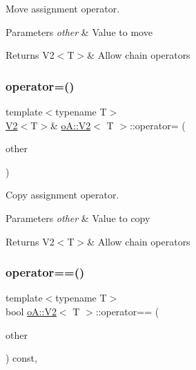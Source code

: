 Move assignment operator. 


\begin{DoxyParams}{Parameters}
{\em other} & Value to move \\
\hline
\end{DoxyParams}
\begin{DoxyReturn}{Returns}
V2$<$\+T$>$\& Allow chain operators 
\end{DoxyReturn}
\mbox{\label{structo_a_1_1_v2_a144fb5845961c65ae8d6417ecca9e395}} 
\subsubsection{\texorpdfstring{operator=()}{operator=()}\hspace{0.1cm}{\footnotesize\ttfamily [2/2]}}
{\footnotesize\ttfamily template$<$typename T$>$ \\
\mbox{\hyperlink{structo_a_1_1_v2}{V2}}$<$T$>$\& \mbox{\hyperlink{structo_a_1_1_v2}{o\+A\+::\+V2}}$<$ T $>$\+::operator= (\begin{DoxyParamCaption}\item[{const \mbox{\hyperlink{structo_a_1_1_v2}{o\+A\+::\+V2}}$<$ T $>$ \&}]{other }\end{DoxyParamCaption})\hspace{0.3cm}{\ttfamily [inline]}}



Copy assignment operator. 


\begin{DoxyParams}{Parameters}
{\em other} & Value to copy \\
\hline
\end{DoxyParams}
\begin{DoxyReturn}{Returns}
V2$<$\+T$>$\& Allow chain operators 
\end{DoxyReturn}
\mbox{\label{structo_a_1_1_v2_a7f3c992b4271b76c704b30a42801facb}} 
\subsubsection{\texorpdfstring{operator==()}{operator==()}}
{\footnotesize\ttfamily template$<$typename T$>$ \\
bool \mbox{\hyperlink{structo_a_1_1_v2}{o\+A\+::\+V2}}$<$ T $>$\+::operator== (\begin{DoxyParamCaption}\item[{const \mbox{\hyperlink{structo_a_1_1_v2}{o\+A\+::\+V2}}$<$ T $>$ \&}]{other }\end{DoxyParamCaption}) const\hspace{0.3cm}{\ttfamily [inline]}, {\ttfamily [noexcept]}}



